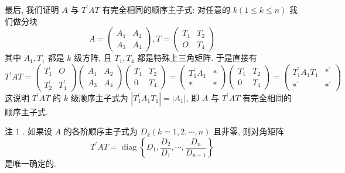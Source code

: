 \documentclass{article}
\begin{document}
最后, 我们证明 $A$ 与 $T^{\prime} A T$ 有完全相同的顺序主子式: 对任意的 $k(1 \leq k \leq n)$ 我们做分块
\begin{equation*}
    A=\left(\begin{array}{ll}
        A_{1} & A_{2} \\
        A_{3} & A_{4}
    \end{array}\right), T=\left(\begin{array}{cc}
        T_{1} & T_{2} \\
        O     & T_{4}
    \end{array}\right)
\end{equation*}
其中 $A_{1}, T_{1}$ 都是 $k$ 级方阵, 且 $T_{1}, T_{4}$ 都是特殊上三角矩阵. 于是直接有
\begin{equation*}
    T^{\prime} A T=\left(\begin{array}{cc}
            T_{1}^{\prime} & O              \\
            T_{2}^{\prime} & T_{4}^{\prime}
        \end{array}\right)\left(\begin{array}{cc}
            A_{1} & A_{2} \\
            A_{3} & A_{4}
        \end{array}\right)\left(\begin{array}{cc}
            T_{1} & T_{2} \\
            0     & T_{4}
        \end{array}\right)=\left(\begin{array}{cc}
            T_{1}^{\prime} A_{1} & * \\
            *                    & *
        \end{array}\right)\left(\begin{array}{cc}
            T_{1} & T_{2} \\
            0     & T_{4}
        \end{array}\right)=\left(\begin{array}{cc}
            T_{1}^{\prime} A_{1} T_{1} & *^{\prime} \\
            *^{\prime}                 & *^{\prime}
        \end{array}\right)
\end{equation*}
这说明 $T^{\prime} A T$ 的 $k$ 级顺序主子式为 $\left|T_{1}^{\prime} A_{1} T_{1}\right|=\left|A_{1}\right|$, 即 $A$ 与 $T^{\prime} A T$ 有完全相同的顺序主子式.

{\heiti 注 1 .} 如果设 $A$ 的各阶顺序主子式为 $D_{k}(k=1,2, \cdots, n)$ 且非零, 则对角矩阵
\begin{equation*}
    T^{\prime} A T=\operatorname{diag}\left\{D_{1}, \frac{D_{2}}{D_{1}}, \cdots, \frac{D_{n}}{D_{n-1}}\right\}
\end{equation*}
是唯一确定的.
\end{document}
